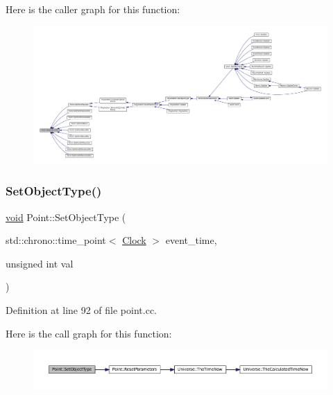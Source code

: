 Here is the caller graph for this function\+:\nopagebreak
\begin{figure}[H]
\begin{center}
\leavevmode
\includegraphics[width=350pt]{class_point_ac3e94cb7e2ab1d6008ff1d5df00641c2_icgraph}
\end{center}
\end{figure}
\mbox{\label{class_point_a3afeb2d7a2e2b7d9406a57fefa1af2ee}} 
\subsubsection{\texorpdfstring{Set\+Object\+Type()}{SetObjectType()}}
{\footnotesize\ttfamily \mbox{\hyperlink{glad_8h_a950fc91edb4504f62f1c577bf4727c29}{void}} Point\+::\+Set\+Object\+Type (\begin{DoxyParamCaption}\item[{std\+::chrono\+::time\+\_\+point$<$ \mbox{\hyperlink{universe_8h_a0ef8d951d1ca5ab3cfaf7ab4c7a6fd80}{Clock}} $>$}]{event\+\_\+time,  }\item[{unsigned int}]{val }\end{DoxyParamCaption})}



Definition at line 92 of file point.\+cc.

Here is the call graph for this function\+:\nopagebreak
\begin{figure}[H]
\begin{center}
\leavevmode
\includegraphics[width=350pt]{class_point_a3afeb2d7a2e2b7d9406a57fefa1af2ee_cgraph}
\end{center}
\end{figure}
\mbox{\label{class_point_adb977a2f01e7a2b549e1bd36fa6f5354}} 
